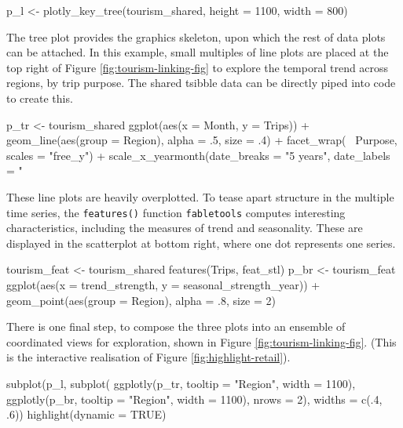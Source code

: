 \begin{Schunk}
\begin{Sinput}
p_l <- plotly_key_tree(tourism_shared, height = 1100, width = 800)
\end{Sinput}
\end{Schunk}

The tree plot provides the graphics skeleton, upon which the rest of
data plots can be attached. In this example, small multiples of line
plots are placed at the top right of Figure
\ref{fig:tourism-linking-fig} to explore the temporal trend across
regions, by trip purpose. The shared tsibble data can be directly piped
into  code to create this.

\begin{Schunk}
\begin{Sinput}
p_tr <- tourism_shared %
  ggplot(aes(x = Month, y = Trips)) +
  geom_line(aes(group = Region), alpha = .5, size = .4) +
  facet_wrap(~ Purpose, scales = "free_y") +
  scale_x_yearmonth(date_breaks = "5 years", date_labels = "%
\end{Sinput}
\end{Schunk}

These line plots are heavily overplotted. To tease apart structure in
the multiple time series, the \texttt{features()} function
\texttt{fabletools} computes interesting characteristics, including the
measures of trend and seasonality. These are displayed in the
scatterplot at bottom right, where one dot represents one series.

\begin{Schunk}
\begin{Sinput}
tourism_feat <- tourism_shared %
  features(Trips, feat_stl)
p_br <- tourism_feat %
  ggplot(aes(x = trend_strength, y = seasonal_strength_year)) +
  geom_point(aes(group = Region), alpha = .8, size = 2)
\end{Sinput}
\end{Schunk}

There is one final step, to compose the three plots into an ensemble of
coordinated views for exploration, shown in Figure
\ref{fig:tourism-linking-fig}. (This is the interactive realisation of
Figure \ref{fig:highlight-retail}).

\begin{Schunk}
\begin{Sinput}
subplot(p_l,
  subplot(
    ggplotly(p_tr, tooltip = "Region", width = 1100),
    ggplotly(p_br, tooltip = "Region", width = 1100),
    nrows = 2),
  widths = c(.4, .6)) %
  highlight(dynamic = TRUE)
\end{Sinput}
\end{Schunk}

